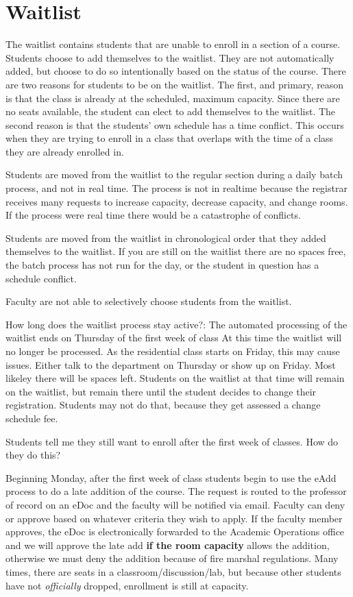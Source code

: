 \section{Waitlist}\label{waitlist}

The waitlist contains students that are unable to enroll in a section of
a course. Students choose to add themselves to the waitlist. They are
not automatically added, but choose to do so intentionally based on the
status of the course. There are two reasons for students to be on the
waitlist. The first, and primary, reason is that the class is already at
the scheduled, maximum capacity. Since there are no seats available, the
student can elect to add themselves to the waitlist. The second reason
is that the students' own schedule has a time conflict. This occurs when
they are trying to enroll in a class that overlaps with the time of a
class they are already enrolled in.

Students are moved from the waitlist to the regular section during a
daily batch process, and not in real time. The process is not in
realtime because the registrar receives many requests to increase
capacity, decrease capacity, and change rooms. If the process were real
time there would be a catastrophe of conflicts.

Students are moved from the waitlist in chronological order that they
added themselves to the waitlist. If you are still on the waitlist there
are no spaces free, the batch process has not run for the day, or the
student in question has a schedule conflict.

Faculty are not able to selectively choose students from the waitlist.

How long does the waitlist process stay active?: The automated
processing of the waitlist ends on Thursday of the first week of class
At this time the waitlist will no longer be processed. 
As the residential class starts on Friday, this may cause
issues. Either talk to the department on Thursday or show up on
Friday. Most likeley there will be spaces left. 
Students on the waitlist at that time will remain on the waitlist, but remain there
until the student decides to change their registration. Students may not
do that, because they get assessed a change schedule fee.

Students tell me they still want to enroll after the first week of
classes. How do they do this?

Beginning Monday, after the first week of class students begin to use
the eAdd process to do a late addition of the course. The request is
routed to the professor of record on an eDoc and the faculty will be
notified via email. Faculty can deny or approve based on whatever
criteria they wish to apply. If the faculty member approves, the eDoc
is electronically forwarded to the Academic Operations office and we
will approve the late add \textbf{if the room capacity} allows the
addition, otherwise we must deny the addition because of fire marshal
regulations. Many times, there are seats in a
classroom/discussion/lab, but because other students have not
\emph{officially} dropped, enrollment is still at capacity.

